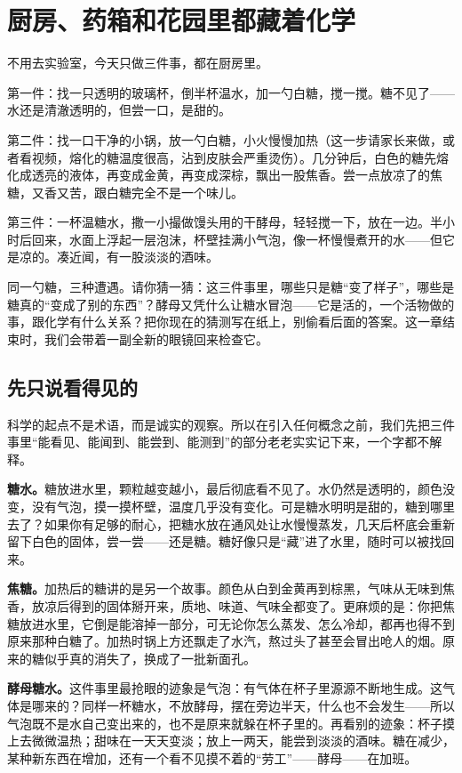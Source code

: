\chapter{厨房、药箱和花园里都藏着化学}

\begin{kaichang}
不用去实验室，今天只做三件事，都在厨房里。

第一件：找一只透明的玻璃杯，倒半杯温水，加一勺白糖，搅一搅。糖不见了——水还是清澈透明的，但尝一口，是甜的。

第二件：找一口干净的小锅，放一勺白糖，小火慢慢加热（这一步请家长来做，或者看视频，熔化的糖温度很高，沾到皮肤会严重烫伤）。几分钟后，白色的糖先熔化成透亮的液体，再变成金黄，再变成深棕，飘出一股焦香。尝一点放凉了的焦糖，又香又苦，跟白糖完全不是一个味儿。

第三件：一杯温糖水，撒一小撮做馒头用的干酵母，轻轻搅一下，放在一边。半小时后回来，水面上浮起一层泡沫，杯壁挂满小气泡，像一杯慢慢煮开的水——但它是凉的。凑近闻，有一股淡淡的酒味。

同一勺糖，三种遭遇。请你猜一猜：这三件事里，哪些只是糖“变了样子”，哪些是糖真的“变成了别的东西”？酵母又凭什么让糖水冒泡——它是活的，一个活物做的事，跟化学有什么关系？把你现在的猜测写在纸上，别偷看后面的答案。这一章结束时，我们会带着一副全新的眼镜回来检查它。
\end{kaichang}

\section{先只说看得见的}

科学的起点不是术语，而是诚实的观察。所以在引入任何概念之前，我们先把三件事里“能看见、能闻到、能尝到、能测到”的部分老老实实记下来，一个字都不解释。

\textbf{糖水。}糖放进水里，颗粒越变越小，最后彻底看不见了。水仍然是透明的，颜色没变，没有气泡，摸一摸杯壁，温度几乎没有变化。可是糖水明明是甜的，糖到哪里去了？如果你有足够的耐心，把糖水放在通风处让水慢慢蒸发，几天后杯底会重新留下白色的固体，尝一尝——还是糖。糖好像只是“藏”进了水里，随时可以被找回来。

\textbf{焦糖。}加热后的糖讲的是另一个故事。颜色从白到金黄再到棕黑，气味从无味到焦香，放凉后得到的固体掰开来，质地、味道、气味全都变了。更麻烦的是：你把焦糖放进水里，它倒是能溶掉一部分，可无论你怎么蒸发、怎么冷却，都再也得不到原来那种白糖了。加热时锅上方还飘走了水汽，熬过头了甚至会冒出呛人的烟。原来的糖似乎真的消失了，换成了一批新面孔。

\textbf{酵母糖水。}这件事里最抢眼的迹象是气泡：有气体在杯子里源源不断地生成。这气体是哪来的？同样一杯糖水，不放酵母，摆在旁边半天，什么也不会发生——所以气泡既不是水自己变出来的，也不是原来就躲在杯子里的。再看别的迹象：杯子摸上去微微温热；甜味在一天天变淡；放上一两天，能尝到淡淡的酒味。糖在减少，某种新东西在增加，还有一个看不见摸不着的“劳工”——酵母——在加班。

